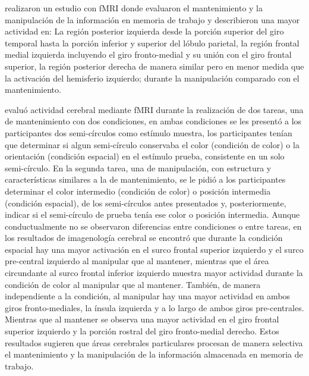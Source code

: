 \documentclass[12pt,letterpaper,final]{article}
\begin{document}
 realizaron un estudio con fMRI donde evaluaron el mantenimiento y la manipulación de la información en  memoria de trabajo y describieron  una mayor actividad en: La región posterior izquierda desde la porción superior del giro temporal hasta la porción inferior y superior del lóbulo parietal, la región frontal medial izquierda incluyendo el giro fronto-medial y su unión con el giro frontal superior, la región posterior derecha de manera similar pero en menor medida que la activación del hemisferio izquierdo;  durante la manipulación comparado con el mantenimiento.


 evaluó actividad cerebral mediante fMRI durante la realización de dos tareas, una de mantenimiento con dos condiciones, en ambas condiciones se les presentó a los participantes dos semi-círculos como estímulo  muestra, los participantes tenían que determinar si algun semi-círculo conservaba el color (condición de color) o la orientación (condición espacial) en el estímulo  prueba, consistente en un solo semi-círculo. En la segunda tarea, una de manipulación, con estructura y características similares a la de mantenimiento, se le pidió a los participantes determinar el color intermedio (condición de color) o posición intermedia (condición espacial), de los semi-círculos antes presentados y, posteriormente, indicar si el semi-círculo de prueba tenía ese color o posición intermedia.
Aunque conductualmente no se observaron diferencias entre condiciones o entre tareas, en los resultados de imagenología cerebral se encontró  que durante la condición espacial hay una mayor activación en el surco frontal superior izquierdo y el surco pre-central izquierdo al manipular que al mantener, mientras que el área circundante al surco frontal inferior izquierdo muestra mayor actividad durante la condición de color al manipular que al mantener. 
También, de manera independiente a la condición, al manipular hay una mayor actividad en ambos giros fronto-mediales, la ínsula izquierda y a lo largo de ambos giros pre-centrales. Mientras que al mantener se observa una mayor actividad en el giro frontal superior izquierdo y la porción rostral del giro fronto-medial derecho. Estos resultados sugieren que áreas cerebrales particulares procesan de manera selectiva el mantenimiento y la manipulación de la información almacenada en memoria de trabajo.
\end{document}
